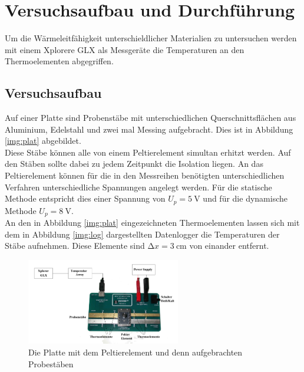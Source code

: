\section{Versuchsaufbau und Durchführung}

\noindent Um die Wärmeleitfähigkeit unterschieldlicher Materialien zu untersuchen werden mit einem Xplorere GLX als Messgeräte die Temperaturen an den Thermoelementen abgegriffen.

\subsection{Versuchsaufbau}
Auf einer Platte sind Probenstäbe mit unterschiedlichen Querschnittsflächen aus Aluminium, Edelstahl und zwei mal Messing aufgebracht.
Dies ist in Abbildung \ref{img:plat} abgebildet.\\
Diese Stäbe können alle von einem Peltierelement simultan erhitzt werden. Auf den Stäben sollte dabei zu jedem Zeitpunkt die Isolation liegen.
An das Peltierelement können für die in den Messreihen benötigten unterschiedlichen Verfahren unterschiedliche Spannungen angelegt werden.
Für die statische Methode entspricht dies einer Spannung von $U_p =\SI{5}{\volt}$ und für die dynamische Methode $U_p =\SI{8}{\volt}$.\\
An den in Abbildung \ref{img:plat} eingezeichneten Thermoelementen lassen sich mit dem in Abbildung \ref{img:log} dargestellten Datenlogger die Temperaturen der Stäbe aufnehmen.
Diese Elemente sind $\increment x = \SI{3}{\centi\metre}$ von einander entfernt.

\begin{figure}[ht]
    \centering
    \includegraphics[width=0.6\textwidth]{latex/images/platine.PNG}
    \caption{Die Platte mit dem Peltierelement und denn aufgebrachten Probestäben \protect \cite{V204}}
  \label{fig:plat}
\end{figure}

